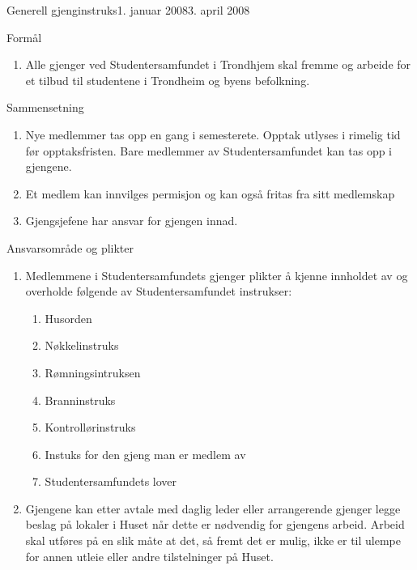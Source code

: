 

\begin{instruks}{Generell gjenginstruks}{1. januar 2008}{3. april 2008}
    
    \begin{instruksledd}{Formål}
        \begin{enumerate}
            \item Alle gjenger ved Studentersamfundet i Trondhjem skal fremme og arbeide for et
                  tilbud til studentene i Trondheim og byens befolkning.
        \end{enumerate}
    \end{instruksledd}


    \begin{instruksledd}{Sammensetning}
        \begin{enumerate}
            \item Nye medlemmer tas opp en gang i semesterete. Opptak utlyses i rimelig
                tid før opptaksfristen. Bare medlemmer av Studentersamfundet kan tas opp i
                gjengene.
            \item Et medlem kan innvilges permisjon og kan også fritas fra sitt medlemskap
            \item Gjengsjefene har ansvar for gjengen innad.
        \end{enumerate}

    \end{instruksledd}


    \begin{instruksledd}{Ansvarsområde og plikter}
        \begin{enumerate}
            \item Medlemmene i Studentersamfundets gjenger plikter å kjenne innholdet av
                og overholde følgende av Studentersamfundet instrukser:
                \begin{enumerate}
                    \item Husorden
                    \item Nøkkelinstruks
                    \item Rømningsintruksen
                    \item Branninstruks
                    \item Kontrollørinstruks
                    \item Instuks for den gjeng man er medlem av
                    \item Studentersamfundets lover
                \end{enumerate}
            \item Gjengene kan etter avtale med daglig leder eller arrangerende gjenger
                legge beslag på lokaler i Huset når dette er nødvendig for gjengens
                arbeid. Arbeid skal utføres på en slik måte at det, så fremt det er mulig,
                ikke er til ulempe for annen utleie eller andre tilstelninger på Huset.
        \end{enumerate}

    \end{instruksledd}

\end{instruks}



